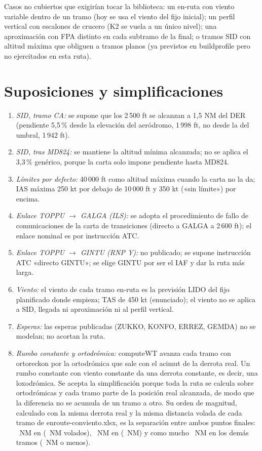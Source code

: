\documentclass[11pt,a4paper]{article}
\DeclareRobustCommand{\m}[1]{{\ttfamily\def\_{\textunderscore\penalty100\relax}#1}}
\begin{document}
Casos no cubiertos que exigirían tocar la biblioteca: un en-ruta con viento variable dentro de un tramo (hoy se usa el viento del fijo inicial); un perfil vertical con escalones de crucero (K2 se vuela a un único nivel); una aproximación con FPA distinto en cada subtramo de la final; o tramos SID con altitud máxima que obliguen a tramos planos (ya previstos en \m{build\_profile} pero no ejercitados en esta ruta).

\section{Suposiciones y simplificaciones}\label{ap:supuestos}

\begin{enumerate}
\item \emph{SID, tramo CA:} se supone que los 2\,500 ft se alcanzan a 1,5 NM del DER (pendiente 5,5\,\% desde la elevación del aeródromo, 1\,998 ft, no desde la del umbral, 1\,942 ft).
\item \emph{SID, tras MD824:} se mantiene la altitud mínima alcanzada; no se aplica el 3,3\,\% genérico, porque la carta solo impone pendiente hasta MD824.
\item \emph{Límites por defecto:} 40\,000 ft como altitud máxima cuando la carta no la da; IAS máxima 250 kt por debajo de 10\,000 ft y 350 kt («sin límite») por encima.
\item \emph{Enlace TOPPU $\rightarrow$ GALGA (ILS):} se adopta el procedimiento de fallo de comunicaciones de la carta de transiciones (directo a GALGA a 2\,600 ft); el enlace nominal es por instrucción ATC.
\item \emph{Enlace TOPPU $\rightarrow$ GINTU (RNP Y):} no publicado; se supone instrucción ATC «directo GINTU»; se elige GINTU por ser el IAF y dar la ruta más larga.
\item \emph{Viento:} el viento de cada tramo en-ruta es la previsión LIDO del fijo planificado donde empieza; TAS de 450 kt (enunciado); el viento no se aplica a SID, llegada ni aproximación ni al perfil vertical.
\item \emph{Esperas:} las esperas publicadas (ZUKKO, KONFO, ERREZ, GEMDA) no se modelan; no acortan la ruta.
\item \emph{Rumbo constante y ortodrómica:} \m{computeWT} avanza cada tramo con \m{orto\_reckon} por la ortodrómica que sale con el acimut de la derrota real. Un rumbo constante con viento constante da una derrota constante, es decir, una loxodrómica. Se acepta la simplificación porque toda la ruta se calcula sobre ortodrómicas y cada tramo parte de la posición real alcanzada, de modo que la diferencia no se acumula de un tramo a otro. Su orden de magnitud, calculado con la misma derrota real y la misma distancia volada de cada tramo de \m{enroute-conviento.xlsx}, es la separación entre ambos puntos finales: \loxA~NM en \loxLegA{} (\loxDA~NM volados), \loxB~NM en \loxLegB{} (\loxDB~NM) y como mucho \loxRest~NM en los demás tramos (\loxRestD~NM o menos).

\end{enumerate}
\end{document}
